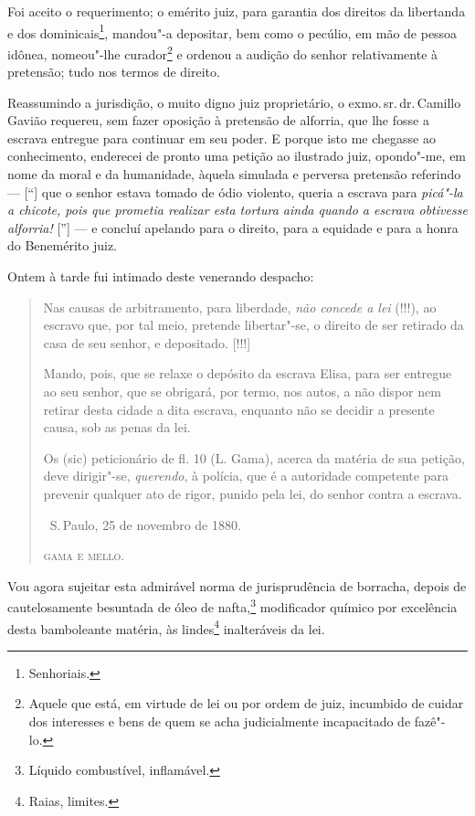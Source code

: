 Foi aceito o requerimento; o emérito juiz, para garantia dos direitos da
libertanda e dos dominicais\footnote{Senhoriais.}, mandou"-a depositar,
bem como o pecúlio, em mão de pessoa idônea, nomeou"-lhe
curador\footnote{Aquele que está, em virtude de lei ou por ordem de
  juiz, incumbido de cuidar dos interesses e bens de quem se acha
  judicialmente incapacitado de fazê"-lo.} e ordenou a audição do senhor
relativamente à pretensão; tudo nos termos de direito.

Reassumindo a jurisdição, o muito digno juiz proprietário, o exmo.\,sr.\,dr.\,Camillo Gavião requereu, sem fazer oposição à pretensão de alforria,
que lhe fosse a escrava entregue para continuar em seu poder. E porque
isto me chegasse ao conhecimento, enderecei de pronto uma petição ao
ilustrado juiz, opondo"-me, em nome da moral e da humanidade, àquela
simulada e perversa pretensão referindo --- {[}``{]} que o senhor estava
tomado de ódio violento, queria a escrava para \emph{picá"-la a chicote,
pois que prometia realizar esta tortura ainda quando a escrava obtivesse
alforria!} {[}''{]} --- e concluí apelando para o direito, para a equidade
e para a honra do Benemérito juiz.

Ontem à tarde fui intimado deste venerando despacho:

\begin{quote}
Nas causas de arbitramento, para liberdade, \emph{não concede a lei}
(!!!), ao escravo que, por tal meio, pretende libertar"-se, o direito de
ser retirado da casa de seu senhor, e depositado. {[}!!!{]}

Mando, pois, que se relaxe o depósito da escrava Elisa, para ser
entregue ao seu senhor, que se obrigará, por termo, nos autos, a não
dispor nem retirar desta cidade a dita escrava, enquanto não se decidir
a presente causa, sob as penas da lei.

Os (sic) peticionário de fl. 10 (L. Gama), acerca da matéria de sua
petição, deve dirigir"-se, \emph{querendo}, à polícia, que é a autoridade
competente para prevenir qualquer ato de rigor, punido pela lei, do
senhor contra a escrava.

\medskip

\hfill\ S.\,Paulo, 25 de novembro de 1880.\smallskip

\hfill\textsc{gama e mello.}
\end{quote}

\asterisc

Vou agora sujeitar esta admirável norma de jurisprudência de borracha,
depois de cautelosamente besuntada de óleo de nafta,\footnote{Líquido
  combustível, inflamável.} modificador químico por excelência desta
bamboleante matéria, às lindes\footnote{Raias, limites.} inalteráveis
da lei.

